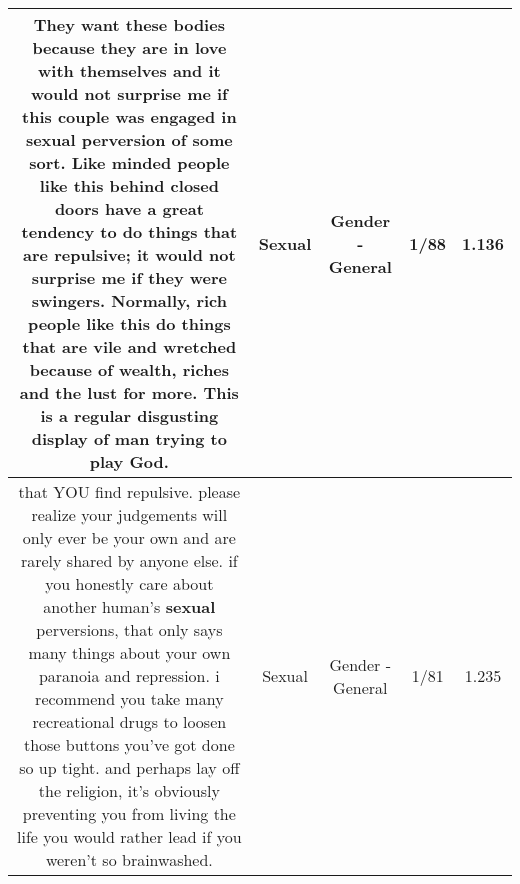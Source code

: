 \documentclass[11pt]{article}
\newlength\mylength
\begin{document}
\begin{center}
\begin{longtable}{|C{.65\mylength}|C{.30\mylength}|C{.12\mylength}|C{.12\mylength}|C{.12\mylength}|}
  \small They want these bodies because they are in love with themselves and it would not surprise me if this couple was engaged in \textbf{sexual} perversion of some sort. Like minded people like this behind closed doors have a great tendency to do things that are repulsive; it would not surprise me if they were swingers. Normally, rich people like this do things that are vile and wretched because of wealth, riches and the lust for more. This is a regular disgusting display of man trying to play God.\normalsize   & Sexual & Gender - General & 1/88 & 1.136 \\  \hline
  \small that YOU find repulsive. please realize your judgements will only ever be your own and are rarely shared by anyone else. if you honestly care about another human's \textbf{sexual} perversions, that only says many things about your own paranoia and repression. i recommend you take many recreational drugs to loosen those buttons you've got done so up tight. and perhaps lay off the religion, it's obviously preventing you from living the life you would rather lead if you weren't so brainwashed.\normalsize   & Sexual & Gender - General & 1/81 & 1.235 \\  \hline

\end{longtable}
\end{center}
\end{document}
